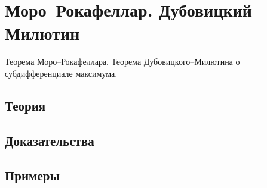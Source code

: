 
\section{Моро–Рокафеллар. Дубовицкий–Милютин}
\label{sec:2.4.06-moreau-rockafellar}

\begin{ticket}
Теорема Моро–Рокафеллара. Теорема Дубовицкого–Милютина о субдифференциале максимума.
\end{ticket}

\subsection*{Теория}

\subsection*{Доказательства}

\subsection*{Примеры}
